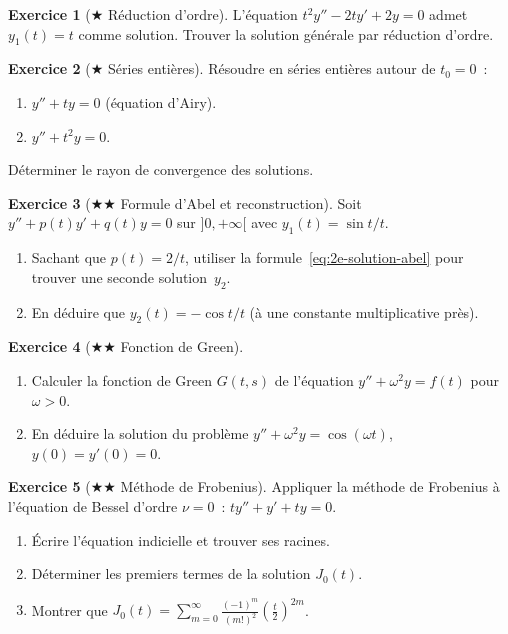 \documentclass[12pt,a4paper,openany]{book}
\theoremstyle{definition}
\newtheorem{exercice}{Exercice}[chapter]
\theoremstyle{plain}
\theoremstyle{remark}
\begin{document}
\begin{exercice}[$\bigstar$ Réduction d'ordre]\label{exo:reduction}
  L'équation $t^2 y'' - 2ty' + 2y = 0$ admet $y_1(t) = t$ comme
  solution. Trouver la solution générale par réduction d'ordre.
\end{exercice}

\begin{exercice}[$\bigstar$ Séries entières]\label{exo:series-1}
  Résoudre en séries entières autour de $t_0 = 0$~:
  \begin{enumerate}[label=\alph*)]
    \item $y'' + ty = 0$ (équation d'Airy).
    \item $y'' + t^2 y = 0$.
  \end{enumerate}
  Déterminer le rayon de convergence des solutions.
\end{exercice}

\begin{exercice}[$\bigstar\bigstar$ Formule d'Abel et reconstruction]\label{exo:abel-reconstr}
  Soit $y'' + p(t)y' + q(t)y = 0$ sur $]0,+\infty[$ avec
  $y_1(t) = \sin t / t$.
  \begin{enumerate}[label=\alph*)]
    \item Sachant que $p(t) = 2/t$, utiliser la formule~\eqref{eq:2e-solution-abel}
      pour trouver une seconde solution~$y_2$.
    \item En déduire que $y_2(t) = -\cos t / t$ (à une constante
      multiplicative près).
  \end{enumerate}
\end{exercice}

\begin{exercice}[$\bigstar\bigstar$ Fonction de Green]\label{exo:green}
  \begin{enumerate}[label=\alph*)]
    \item Calculer la fonction de Green $G(t,s)$ de l'équation
      $y'' + \omega^2 y = f(t)$ pour $\omega > 0$.
    \item En déduire la solution du problème
      $y'' + \omega^2 y = \cos(\omega t)$, $y(0) = y'(0) = 0$.
  \end{enumerate}
\end{exercice}

\begin{exercice}[$\bigstar\bigstar$ Méthode de Frobenius]\label{exo:frobenius}
  Appliquer la méthode de Frobenius à l'équation de Bessel d'ordre
  $\nu = 0$~: $ty'' + y' + ty = 0$.
  \begin{enumerate}[label=\alph*)]
    \item Écrire l'équation indicielle et trouver ses racines.
    \item Déterminer les premiers termes de la solution $J_0(t)$.
    \item Montrer que $J_0(t) = \sum_{m=0}^\infty \frac{(-1)^m}{(m!)^2}
      \left(\frac{t}{2}\right)^{2m}$.
  \end{enumerate}
\end{exercice}
\end{document}
